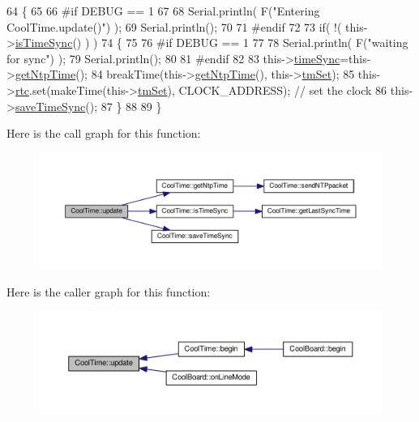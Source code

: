 \begin{DoxyCode}
64 \{
65 
66 \textcolor{preprocessor}{#if DEBUG == 1}
67 
68     Serial.println( F(\textcolor{stringliteral}{"Entering CoolTime.update()"}) );
69     Serial.println();
70 
71 \textcolor{preprocessor}{#endif }
72 
73     \textcolor{keywordflow}{if}( !( this->\hyperlink{classCoolTime_a5ae038a4498602b189f76a10bf02adf8}{isTimeSync}() ) )
74     \{
75     
76 \textcolor{preprocessor}{    #if DEBUG == 1}
77 
78         Serial.println( F(\textcolor{stringliteral}{"waiting for sync"}) );
79         Serial.println();
80 
81 \textcolor{preprocessor}{    #endif }
82 
83         this->\hyperlink{classCoolTime_a9d032e76c3470a15b3bbbc52af6463f7}{timeSync}=this->\hyperlink{classCoolTime_a41fbbbfd651c2079f54d4b2911e4c705}{getNtpTime}();
84         breakTime(this->\hyperlink{classCoolTime_a41fbbbfd651c2079f54d4b2911e4c705}{getNtpTime}(), this->\hyperlink{classCoolTime_ad33c2713c903ff064ad09c46406ae088}{tmSet});
85         this->\hyperlink{classCoolTime_abd38f2384ff90692b1568d9db869412e}{rtc}.set(makeTime(this->\hyperlink{classCoolTime_ad33c2713c903ff064ad09c46406ae088}{tmSet}), CLOCK\_ADDRESS); \textcolor{comment}{// set the clock}
86         this->\hyperlink{classCoolTime_ae9658c9b377510d469e3b88edf33ee85}{saveTimeSync}();
87     \}
88     
89 \}
\end{DoxyCode}
Here is the call graph for this function\+:
\nopagebreak
\begin{figure}[H]
\begin{center}
\leavevmode
\includegraphics[width=350pt]{classCoolTime_aae601f795452cfa48d9fb337aed483a8_cgraph}
\end{center}
\end{figure}
Here is the caller graph for this function\+:
\nopagebreak
\begin{figure}[H]
\begin{center}
\leavevmode
\includegraphics[width=350pt]{classCoolTime_aae601f795452cfa48d9fb337aed483a8_icgraph}
\end{center}
\end{figure}


